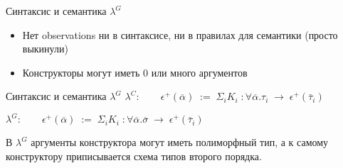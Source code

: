 \documentclass[10pt, mathserif]{beamer}
\theoremstyle{definition}
\begin{document}
\begin{frame}[fragile]{Синтаксис и семантика $\lambda^G$}
\begin{itemize}
 \item Нет observations ни в синтаксисе, ни в правилах для семантики (просто выкинули)
 \item Конструкторы могут иметь 0 или много аргументов
\end{itemize}
\end{frame}


\begin{frame}[fragile]{Синтаксис и семантика $\lambda^G$}
$\lambda^C:\qquad\epsilon^+(\overline{\alpha})\;:=\; \Sigma_i K_i \;:\forall\overline{\alpha}.\tau_i \;\to\;\epsilon^+(\bar{\tau}_i)$

$\lambda^G:\qquad\epsilon^+(\overline{\alpha})\;:=\; \Sigma_i K_i \;:\forall\overline{\alpha}.\overline{\sigma} \;\to\;\epsilon^+(\bar{\tau}_i)$

В $\lambda^G$ аргументы конструктора могут иметь полиморфный тип, а к самому конструктору
приписывается схема типов второго порядка.

% 
\end{frame}
\end{document}
